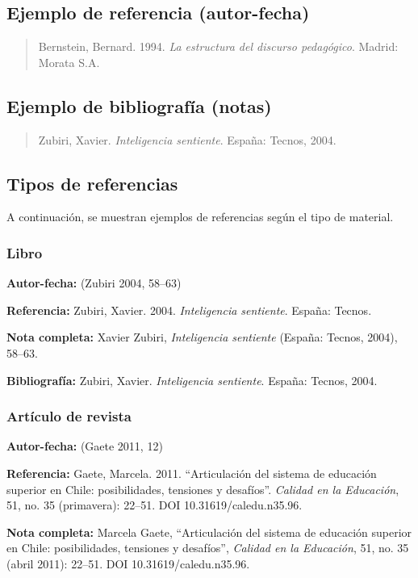 \documentclass[12pt,a4paper]{article}
\begin{document}
\begin{enumerate}[resume]
\subsection*{Ejemplo de referencia (autor-fecha)}
\begin{quote}
Bernstein, Bernard. 1994. \textit{La estructura del discurso pedagógico}. Madrid: Morata S.A.
\end{quote}

\subsection*{Ejemplo de bibliografía (notas)}
\begin{quote}
Zubiri, Xavier. \textit{Inteligencia sentiente}. España: Tecnos, 2004.
\end{quote}

\subsection{Tipos de referencias}
A continuación, se muestran ejemplos de referencias según el tipo de material.

\subsubsection{Libro}
\textbf{Autor-fecha:}  
(Zubiri 2004, 58--63)  

\textbf{Referencia:}  
Zubiri, Xavier. 2004. \textit{Inteligencia sentiente}. España: Tecnos.  

\textbf{Nota completa:}  
Xavier Zubiri, \textit{Inteligencia sentiente} (España: Tecnos, 2004), 58--63.  

\textbf{Bibliografía:}  
Zubiri, Xavier. \textit{Inteligencia sentiente}. España: Tecnos, 2004.  

\subsubsection{Artículo de revista}
\textbf{Autor-fecha:}  
(Gaete 2011, 12)  

\textbf{Referencia:}  
Gaete, Marcela. 2011. ``Articulación del sistema de educación superior en Chile: posibilidades, tensiones y desafíos''. \textit{Calidad en la Educación}, 51, no. 35 (primavera): 22--51. DOI 10.31619/caledu.n35.96.  

\textbf{Nota completa:}  
Marcela Gaete, ``Articulación del sistema de educación superior en Chile: posibilidades, tensiones y desafíos'', \textit{Calidad en la Educación}, 51, no. 35 (abril 2011): 22--51. DOI 10.31619/caledu.n35.96.  


\end{enumerate}
\end{document}
